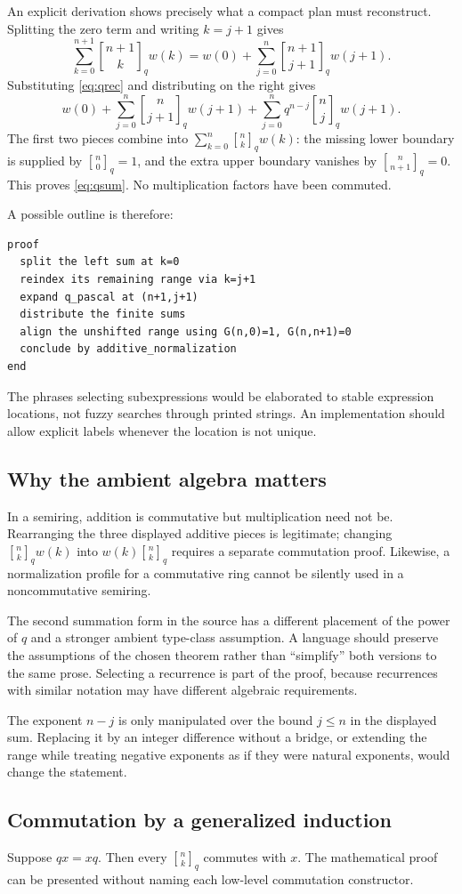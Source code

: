 \documentclass[11pt,a4paper]{article}
\newcommand{\G}[2]{\genfrac{[}{]}{0pt}{}{#1}{#2}_{q}}
\theoremstyle{definition}
\theoremstyle{remark}
\numberwithin{equation}{section}
\begin{document}
An explicit derivation shows precisely what a compact plan must reconstruct. Splitting the zero term and writing $k=j+1$ gives
\[
 \sum_{k=0}^{n+1}\G{n+1}k w(k)
 = w(0)+\sum_{j=0}^{n}\G{n+1}{j+1}w(j+1).
\]
Substituting \cref{eq:qrec} and distributing on the right gives
\[
 w(0)+\sum_{j=0}^{n}\G n{j+1}w(j+1)
 +\sum_{j=0}^{n}q^{n-j}\G nj w(j+1).
\]
The first two pieces combine into $\sum_{k=0}^n\G nk w(k)$: the missing lower boundary is supplied by $\G n0=1$, and the extra upper boundary vanishes by $\G n{n+1}=0$. This proves \cref{eq:qsum}. No multiplication factors have been commuted.

A possible outline is therefore:
\begin{lstlisting}
proof
  split the left sum at k=0
  reindex its remaining range via k=j+1
  expand q_pascal at (n+1,j+1)
  distribute the finite sums
  align the unshifted range using G(n,0)=1, G(n,n+1)=0
  conclude by additive_normalization
end
\end{lstlisting}
The phrases selecting subexpressions would be elaborated to stable expression locations, not fuzzy searches through printed strings. An implementation should allow explicit labels whenever the location is not unique.

\subsection{Why the ambient algebra matters}
In a semiring, addition is commutative but multiplication need not be. Rearranging the three displayed additive pieces is legitimate; changing $\G nk w(k)$ into $w(k)\G nk$ requires a separate commutation proof. Likewise, a normalization profile for a commutative ring cannot be silently used in a noncommutative semiring.

The second summation form in the source has a different placement of the power of $q$ and a stronger ambient type-class assumption.\cite{p-qpascal} A language should preserve the assumptions of the chosen theorem rather than ``simplify'' both versions to the same prose. Selecting a recurrence is part of the proof, because recurrences with similar notation may have different algebraic requirements.

The exponent $n-j$ is only manipulated over the bound $j\le n$ in the displayed sum. Replacing it by an integer difference without a bridge, or extending the range while treating negative exponents as if they were natural exponents, would change the statement.

\subsection{Commutation by a generalized induction}
Suppose $qx=xq$. Then every $\G nk$ commutes with $x$. The mathematical proof can be presented without naming each low-level commutation constructor.
\end{document}
